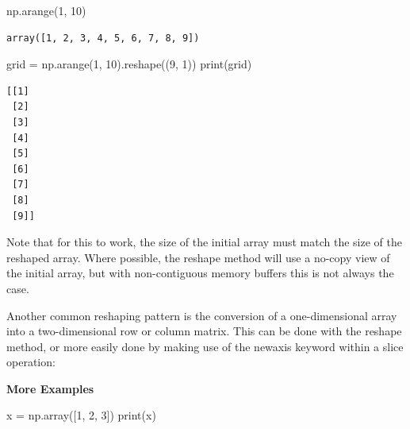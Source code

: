 \documentclass[
  letterpaper,
  DIV=11,
  numbers=noendperiod]{scrreprt}
\newenvironment{Shaded}{\begin{snugshade}}{\end{snugshade}}
\newcommand{\BuiltInTok}[1]{\textcolor[rgb]{0.00,0.23,0.31}{#1}}
\newcommand{\DecValTok}[1]{\textcolor[rgb]{0.68,0.00,0.00}{#1}}
\newcommand{\NormalTok}[1]{\textcolor[rgb]{0.00,0.23,0.31}{#1}}
\newcommand{\OperatorTok}[1]{\textcolor[rgb]{0.37,0.37,0.37}{#1}}
\theoremstyle{plain}
\theoremstyle{definition}
\theoremstyle{remark}
\begin{document}
\begin{Shaded}
\begin{Highlighting}[]
\NormalTok{np.arange(}\DecValTok{1}\NormalTok{, }\DecValTok{10}\NormalTok{)}
\end{Highlighting}
\end{Shaded}

\begin{verbatim}
array([1, 2, 3, 4, 5, 6, 7, 8, 9])
\end{verbatim}

\begin{Shaded}
\begin{Highlighting}[]
\NormalTok{grid }\OperatorTok{=}\NormalTok{ np.arange(}\DecValTok{1}\NormalTok{, }\DecValTok{10}\NormalTok{).reshape((}\DecValTok{9}\NormalTok{, }\DecValTok{1}\NormalTok{))}
\BuiltInTok{print}\NormalTok{(grid)}
\end{Highlighting}
\end{Shaded}

\begin{verbatim}
[[1]
 [2]
 [3]
 [4]
 [5]
 [6]
 [7]
 [8]
 [9]]
\end{verbatim}

\begin{tcolorbox}[enhanced jigsaw, leftrule=.75mm, bottomtitle=1mm, colback=white, toptitle=1mm, opacitybacktitle=0.6, toprule=.15mm, colbacktitle=quarto-callout-note-color!10!white, arc=.35mm, colframe=quarto-callout-note-color-frame, title=\textcolor{quarto-callout-note-color}{\faInfo}\hspace{0.5em}{Note}, titlerule=0mm, rightrule=.15mm, left=2mm, bottomrule=.15mm, breakable, coltitle=black, opacityback=0]

Note that for this to work, the size of the initial array must match the
size of the reshaped array. Where possible, the reshape method will use
a no-copy view of the initial array, but with non-contiguous memory
buffers this is not always the case.

Another common reshaping pattern is the conversion of a one-dimensional
array into a two-dimensional row or column matrix. This can be done with
the reshape method, or more easily done by making use of the newaxis
keyword within a slice operation:

\end{tcolorbox}

\textbf{More Examples}

\begin{Shaded}
\begin{Highlighting}[]
\NormalTok{x }\OperatorTok{=}\NormalTok{ np.array([}\DecValTok{1}\NormalTok{, }\DecValTok{2}\NormalTok{, }\DecValTok{3}\NormalTok{])}
\BuiltInTok{print}\NormalTok{(x)}
\end{Highlighting}
\end{Shaded}
\end{document}
